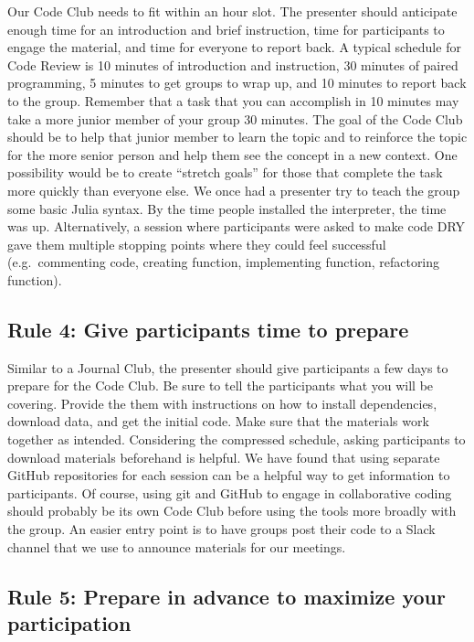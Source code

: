 \documentclass[
  11pt,
]{article}
\begin{document}
Our Code Club needs to fit within an hour slot. The presenter should
anticipate enough time for an introduction and brief instruction, time
for participants to engage the material, and time for everyone to report
back. A typical schedule for Code Review is 10 minutes of introduction
and instruction, 30 minutes of paired programming, 5 minutes to get
groups to wrap up, and 10 minutes to report back to the group. Remember
that a task that you can accomplish in 10 minutes may take a more junior
member of your group 30 minutes. The goal of the Code Club should be to
help that junior member to learn the topic and to reinforce the topic
for the more senior person and help them see the concept in a new
context. One possibility would be to create ``stretch goals'' for those
that complete the task more quickly than everyone else. We once had a
presenter try to teach the group some basic Julia syntax. By the time
people installed the interpreter, the time was up. Alternatively, a
session where participants were asked to make code DRY gave them
multiple stopping points where they could feel successful
(e.g.~commenting code, creating function, implementing function,
refactoring function).

\hypertarget{rule-4-give-participants-time-to-prepare}{%
\subsection{Rule 4: Give participants time to
prepare}\label{rule-4-give-participants-time-to-prepare}}

Similar to a Journal Club, the presenter should give participants a few
days to prepare for the Code Club. Be sure to tell the participants what
you will be covering. Provide the them with instructions on how to
install dependencies, download data, and get the initial code. Make sure
that the materials work together as intended. Considering the compressed
schedule, asking participants to download materials beforehand is
helpful. We have found that using separate GitHub repositories for each
session can be a helpful way to get information to participants. Of
course, using git and GitHub to engage in collaborative coding should
probably be its own Code Club before using the tools more broadly with
the group. An easier entry point is to have groups post their code to a
Slack channel that we use to announce materials for our meetings.

\hypertarget{rule-5-prepare-in-advance-to-maximize-your-participation}{%
\subsection{Rule 5: Prepare in advance to maximize your
participation}\label{rule-5-prepare-in-advance-to-maximize-your-participation}}
\end{document}
